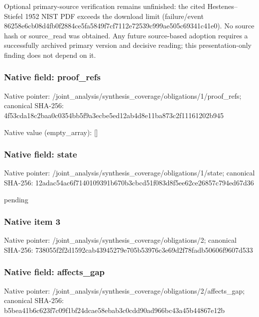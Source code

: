 \documentclass[10pt,a4paper]{article}
\begin{document}
\begingroup\raggedright\sloppy Optional primary-source verification remains unfinished:\allowbreak{} the cited Hestenes{\AtlasUnicodeText –}\allowbreak{}Stiefel 1952 NIST PDF exceeds the download limit (failure/\allowbreak{}event 86258e6cb08d4fb0f2884ce5fa5849f7cf7112e72539c999ae505c69341c41e0). No source hash or source\_\allowbreak{}read was obtained. Any future source-based adoption requires a successfully archived primary version and decisive reading;\allowbreak{} this presentation-only finding does not depend on it.\par\endgroup

\subsubsection{Native field: proof\_\allowbreak{}refs}
Native pointer: /joint\_\allowbreak{}analysis/synthesis\_\allowbreak{}coverage/obligations/1/proof\_\allowbreak{}refs; canonical SHA-256: 4f53cda18c2baa0c0354bb5f9a3ecbe5ed12ab4d8e11ba873c2f11161202b945

Native value (empty\_\allowbreak{}array): []

\subsubsection{Native field: state}
Native pointer: /joint\_\allowbreak{}analysis/synthesis\_\allowbreak{}coverage/obligations/1/state; canonical SHA-256: 12adac54ac6f7140109391b670b3cbcd51f083d8f5ee62ce26857c794ed67d36

\begingroup\raggedright\sloppy pending\par\endgroup

\subsubsection{Native item 3}
Native pointer: /joint\_\allowbreak{}analysis/synthesis\_\allowbreak{}coverage/obligations/2; canonical SHA-256: 738055f2f2d1592cab43945279e705b53976c3e69d2f78fadb50606f9607d533

\subsubsection{Native field: affects\_\allowbreak{}gap}
Native pointer: /joint\_\allowbreak{}analysis/synthesis\_\allowbreak{}coverage/obligations/2/affects\_\allowbreak{}gap; canonical SHA-256: b5bea41b6c623f7c09f1bf24dcae58ebab3c0cdd90ad966bc43a45b44867e12b
\end{document}
